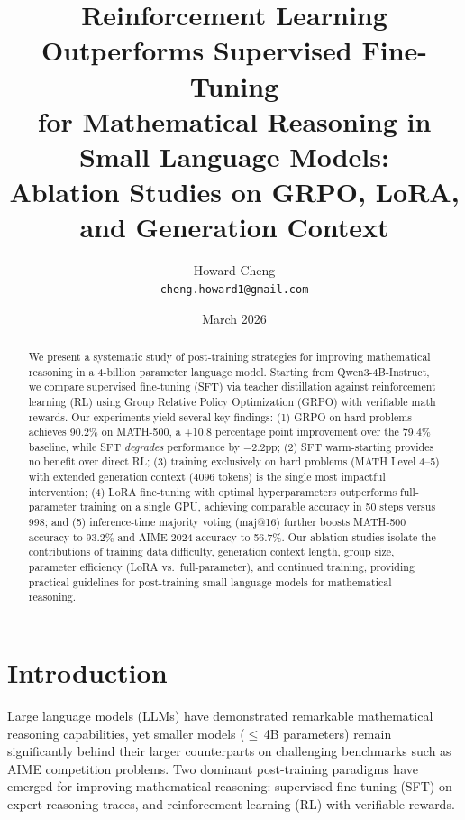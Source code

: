 \documentclass[11pt,a4paper]{article}
\title{Reinforcement Learning Outperforms Supervised Fine-Tuning\\for Mathematical Reasoning in Small Language Models:\\Ablation Studies on GRPO, LoRA, and Generation Context}
\author{
    Howard Cheng \\
    \texttt{cheng.howard1@gmail.com}
}
\date{March 2026}
\newcommand{\modelname}{Qwen3-4B-Instruct}
\begin{document}
\maketitle

\begin{abstract}
We present a systematic study of post-training strategies for improving mathematical reasoning in a 4-billion parameter language model. Starting from \modelname{}, we compare supervised fine-tuning (SFT) via teacher distillation against reinforcement learning (RL) using Group Relative Policy Optimization (GRPO) with verifiable math rewards. Our experiments yield several key findings: (1) GRPO on hard problems achieves 90.2\% on MATH-500, a +10.8 percentage point improvement over the 79.4\% baseline, while SFT \emph{degrades} performance by $-$2.2pp; (2) SFT warm-starting provides no benefit over direct RL; (3) training exclusively on hard problems (MATH Level 4--5) with extended generation context (4096 tokens) is the single most impactful intervention; (4) LoRA fine-tuning with optimal hyperparameters outperforms full-parameter training on a single GPU, achieving comparable accuracy in 50 steps versus 998; and (5) inference-time majority voting (maj@16) further boosts MATH-500 accuracy to 93.2\% and AIME 2024 accuracy to 56.7\%. Our ablation studies isolate the contributions of training data difficulty, generation context length, group size, parameter efficiency (LoRA vs.\ full-parameter), and continued training, providing practical guidelines for post-training small language models for mathematical reasoning.
\end{abstract}

\section{Introduction}

Large language models (LLMs) have demonstrated remarkable mathematical reasoning capabilities, yet smaller models ($\leq$\,4B parameters) remain significantly behind their larger counterparts on challenging benchmarks such as AIME competition problems. Two dominant post-training paradigms have emerged for improving mathematical reasoning: supervised fine-tuning (SFT) on expert reasoning traces, and reinforcement learning (RL) with verifiable rewards.
\end{document}
